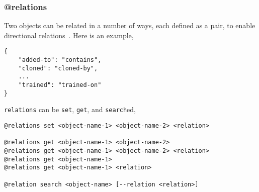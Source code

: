 \subsubsection{@relations}
\label{relations}

Two objects can be related in a number of ways, each defined as a pair, to enable directional relations~. Here is an example,
%
\begin{verbatim}
{
    "added-to": "contains",
    "cloned": "cloned-by",
    ...
    "trained": "trained-on"
}
\end{verbatim}
%
\texttt{relations} can be \texttt{set}, \texttt{get}, and \texttt{search}ed, 
%
\begin{verbatim}
@relations set <object-name-1> <object-name-2> <relation>

@relations get <object-name-1> <object-name-2>
@relations get <object-name-1> <object-name-2> <relation>
@relations get <object-name-1>
@relations get <object-name-1> <relation>

@relation search <object-name> [--relation <relation>]
\end{verbatim}